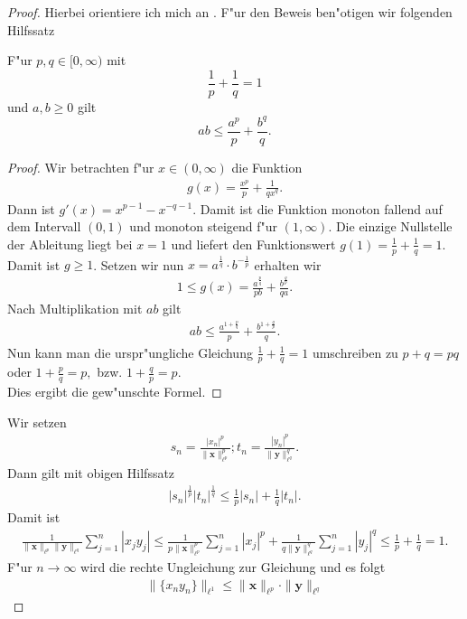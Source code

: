 \begin{proof}
Hierbei orientiere ich mich an \cite{Holder}.
F"ur den Beweis ben"otigen wir folgenden Hilfssatz
\begin{sz}
F"ur $p,q \in [0,\infty)$ mit
\begin{equation*}
\frac{1}{p}+\frac{1}{q}=1
\end{equation*} und $a,b\geq 0$ gilt
\begin{equation*}
ab\leq \frac{a^p}{p}+\frac{b^q}{q}.
\end{equation*}
\end{sz}
\begin{proof}
Wir betrachten f"ur $x\in(0,\infty)$ die Funktion
\begin{eqnarray*}
g(x)=\frac{x^p}{p}+\frac{1}{qx^q}.
\end{eqnarray*}
Dann ist $g'(x)=x^{p-1}-x^{-q-1}$. Damit ist die Funktion monoton fallend auf dem Intervall $(0,1)$ und  monoton steigend f"ur $(1,\infty)$. Die einzige Nullstelle der Ableitung liegt bei $x=1$ und liefert den Funktionswert $g(1)=\frac{1}{p}+\frac{1}{q}=1$. Damit ist $g\geq 1$. Setzen wir nun $x=a^{\frac{1}{q}}\cdot b^{-\frac{1}{p}}$ erhalten wir
\begin{align*}
1\leq g(x) = \frac{a^{\frac{p}{q}}}{pb}+\frac{b^{\frac{q}{p}}}{qa}.
\end{align*}
Nach Multiplikation mit $ab$ gilt
\begin{align*}
ab\leq\frac{a^{1+\frac{p}{q}}}{p}+\frac{b^{1+\frac{q}{p}}}{q}.
\end{align*}
Nun kann man die urspr"ungliche Gleichung $\frac{1}{p}+\frac{1}{q}=1$ umschreiben zu $p+q=pq$ oder $1+\frac{p}{q}=p,$ bzw. $1+\frac{q}{p}=p$.\\
Dies ergibt die gew"unschte Formel.
\end{proof}
Wir setzen
\begin{align*}
s_n=\frac{|x_n|^p}{\|\textbf{x}\|_{\ell^p}^p}; t_n=\frac{|y_n|^p}{\|\textbf{y}\|_{\ell^q}^q}.
\end{align*}
Dann gilt mit obigen Hilfssatz
\begin{align*}
|s_n|^{\frac{1}{p}}|t_n|^{\frac{1}{q}}\leq \frac{1}{p}|s_n|+\frac{1}{q}|t_n|.
\end{align*}
Damit ist
\begin{align*}
\frac{1}{\|\textbf{x}\|_{\ell^p}\|\textbf{y}\|_{\ell^q}}\sum_{j=1}^n|x_jy_j|\leq \frac{1}{p\|\textbf{x}\|_{\ell^p}^p}\sum_{j=1}^n|x_j|^p+\frac{1}{q\|\textbf{y}\|_{\ell^q}^q}\sum_{j=1}^n|y_j|^q\leq\frac{1}{p}+\frac{1}{q}=1.
\end{align*}
F"ur $n\rightarrow \infty$ wird die rechte Ungleichung zur Gleichung und es folgt
\begin{align*}
\|\{x_ny_n\}\|_{\ell^1}\leq\|\textbf{x}\|_{\ell^p}\cdot\|\textbf{y}\|_{\ell^q} 
\end{align*}
\end{proof}
